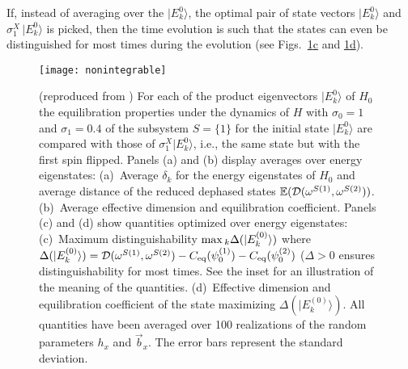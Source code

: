 \documentclass[a4paper,12pt,listof=totoc,index=totoc,bibliography=totoc,headsepline=false,headings=normal,BCOR16.153846mm,DIV12,headinclude,twoside,cleardoublepage=empty,numbers=noenddot,final]{scrreprt}
\newcommand{\refsub}[2]{\hyperref[#1]{\ref*{#1}#2}}
\theoremstyle{mystyle}
\numberwithin{equation}{section}
\numberwithin{figure}{section}
\numberwithin{lemma}{section}
\numberwithin{theorem}{section}
\numberwithin{corollary}{section}
\numberwithin{definition}{section}
\numberwithin{conjecture}{section}
\numberwithin{observation}{section}
\newcommand{\+}{\mkern2mu}
\renewcommand{\max}{\mathchoice{\operatorname*{max}}{\operatorname*{max}}{\mathrm{max}}{\mathrm{max}}} %
\renewcommand{\H}{H}
\newcommand{\ket}[1]{|#1\rangle}
\newcommand{\eqcoef}{C_{\mathrm{eq}}}
\newcommand{\tracedistance}[3][]{
  \ifthenelse{\equal{#2}{}}
  {\ifthenelse{\equal{#3}{}}
    {\mathcal{D}_{#1}}{}
  }{
    \ifthenelse{\equal{#1}{}}
    {\operatorname{\mathcal{D}}(#2,#3)}
    {\operatorname{\mathcal{D}}_{#1}(#2,#3)}
  }
}
\DeclareMathOperator{\1}{\mathds{1}}
\begin{document}
If, instead of averaging over the $\ket{E^0_k}$, the optimal pair of state vectors $\ket{E^0_k}$ and $\sigma^X_1\,\ket{E^0_k}$ is picked, then the time evolution is such that the states can even be distinguished for most times during the evolution (see Figs.~\refsub{fig:absenceofthermalizationnumerics}{c} and \refsub{fig:absenceofthermalizationnumerics}{d}).

\begin{figure}[p]
  \centering
  \texttt{[image: nonintegrable]}
  \caption{(reproduced from \cite{PhysRevLett.10-6})
    For each of the product eigenvectors $\ket{E^0_k}$ of $\H_0$ the equilibration properties under the dynamics of $\H$ with $\sigma_0 = 1$ and $\sigma_1 = 0.4$ of the subsystem $S=\{1\}$ for the initial state $\ket{E^0_k}$ are compared with those of $\sigma^X_1 \ket{E^0_k}$, i.e., the same state but with the first spin flipped.
    Panels (a) and (b) display averages over energy eigenstates:
    (a)~Average $\delta_k$ for the energy eigenstates of $\H_0$ and average distance of the reduced dephased states $\mathbb{E}(\tracedistance{\omega^{S(1)}}{\omega^{S(2)}})$.
    (b)~Average effective dimension and equilibration coefficient.
    Panels (c) and (d) show quantities optimized over energy eigenstates:
    (c)~Maximum distinguishability $\max_k \Delta(\ket{E_k^{(0)}})$ where $\Delta(\ket{E_k^{(0)}}) = \tracedistance{\omega^{S(1)}}{\omega^{S(2)}} - \eqcoef(\psi^{(1)}_0) - \eqcoef(\psi^{(2)}_0)$ ($\Delta>0$ ensures distinguishability for most times. See the inset for an illustration of the meaning of the quantities.
    (d)~Effective dimension and equilibration coefficient of the state maximizing $\Delta(\ket{E_k^{(0)}})$.
    All quantities have been averaged over 100 realizations of the random parameters $h_x$ and $\vec{b}_x$.
    The error bars represent the standard deviation.
  }
  \label{fig:absenceofthermalizationnumerics}
\end{figure}
\end{document}
